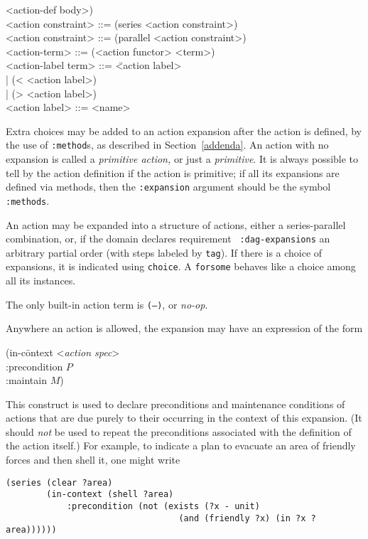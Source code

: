 \begin{nopagebreak}
\begin{tabtt}
                                <action-def body>) \-\-\\
   <action constraint> \> ::= (series <action constraint>\zom) \\
   <action constraint> \> ::= (parallel <action constraint>\zom) \\
   <action-term> \> ::= (<action functor> <term>\zom) \\
   <action-label term> \> ::= \= <action label> \+\+ \\
                             | (< <action label>) \\
                             | (> <action label>) \-\-\\
   <action label> \> ::= <name> \\
\end{tabtt}
\end{nopagebreak}
Extra choices may be added to an action
expansion after the action is defined, by the use of {\tt :method}s, as described in 
Section~\ref{addenda}.  An action with no expansion is called a {\em primitive
action,} or just a {\em primitive}.  It is always possible to tell by the
action definition if the action is primitive; if all its expansions are defined
via methods, then the {\tt :expansion} argument should be the symbol {\tt :methods}.

An action may be expanded into a structure of actions, either a series-parallel
combination, or, if the domain declares requirement {\tt
:dag-expansions} 
an arbitrary partial order (with steps labeled by {\tt tag}).  
If there is a choice of expansions,
it is indicated using {\tt choice}.  A {\tt forsome} behaves like a
choice among all its instances.

The only built-in action term is {\tt (--)}, or {\em no-op}.

Anywhere an action is allowed, the expansion may have an expression of the
form 
\begin{tabtt}
\bump (in-c\=ontext <{\it action spec}> \+\\
           :precondition $P$ \\
           :maintain $M$)
\end{tabtt}
This construct is used to declare preconditions and maintenance conditions of actions that are
due purely to their occurring in the context of this expansion.  (It should {\em not}
be used to repeat the preconditions associated with the definition of
the action itself.)
For example, to
indicate a plan to evacuate an area of friendly forces and then shell it, one
might write
\begin{verbatim}
(series (clear ?area)
        (in-context (shell ?area)
            :precondition (not (exists (?x - unit) 
                                  (and (friendly ?x) (in ?x ?area))))))
\end{verbatim}

